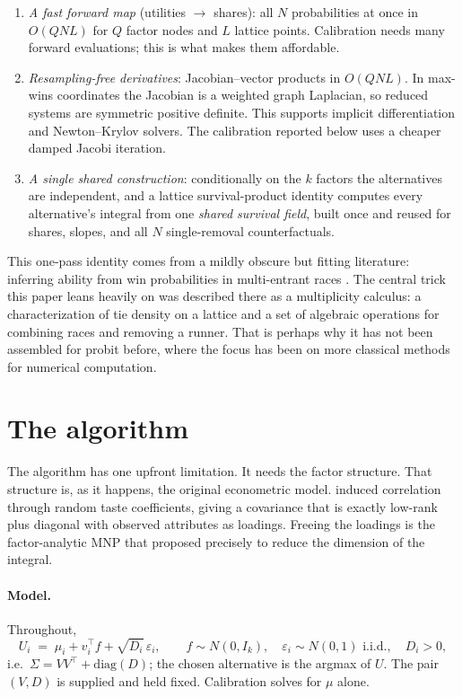\documentclass[12pt]{article}
\theoremstyle{remark}
\begin{document}
\begin{enumerate}
\item \emph{A fast forward map} (utilities $\to$ shares): all $N$
probabilities at once in $O(QNL)$ for $Q$ factor nodes and $L$ lattice
points. Calibration needs many forward evaluations; this is what makes
them affordable.
\item \emph{Resampling-free derivatives}: Jacobian--vector products in
$O(QNL)$. In max-wins coordinates the Jacobian is a weighted graph
Laplacian, so reduced systems are symmetric positive definite. This supports
implicit differentiation and Newton--Krylov solvers. The calibration
reported below uses a cheaper damped Jacobi iteration.
\item \emph{A single shared construction}: conditionally on the $k$
factors the alternatives are independent, and a lattice survival-product
identity computes every alternative's integral from one \emph{shared
survival field}, built once and reused for shares, slopes, and all $N$
single-removal counterfactuals.
\end{enumerate}

This one-pass identity comes from a mildly obscure but fitting literature: inferring ability
from win probabilities in multi-entrant races \citep{cotton2021}. The central trick this paper
leans heavily on was described there as a multiplicity calculus: a characterization of tie density 
on a lattice and a set of algebraic operations for combining races and removing a runner. That is
perhaps why it has not been assembled for probit before, where the focus has been on more classical methods
for numerical computation. 

\section{The algorithm}\label{sec:algorithm}

The algorithm has one upfront limitation. It needs the factor
structure. That structure is, as it happens, the original econometric model. \citet{hausman1978} induced correlation
through random taste coefficients, giving a covariance that is exactly
low-rank plus diagonal with observed attributes as loadings. Freeing the
loadings is the factor-analytic MNP that \citet{mcfadden1984} proposed
precisely to reduce the dimension of the integral. 

\paragraph{Model.} Throughout,
\begin{equation}
U_i \;=\; \mu_i + v_i^\top f + \sqrt{D_i}\,\varepsilon_i,
\qquad f \sim N(0, I_k), \quad \varepsilon_i \sim N(0,1) \text{ i.i.d.},
\quad D_i > 0,
\label{eq:model}
\end{equation}
i.e.\ $\Sigma = VV^\top + \mathrm{diag}(D)$; the chosen alternative is the
argmax of $U$. The pair $(V, D)$ is supplied and held fixed.
Calibration solves for $\mu$ alone.
\end{document}

